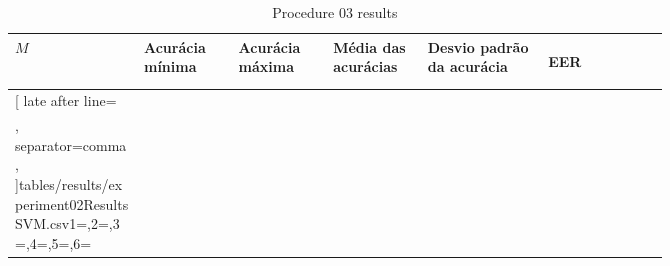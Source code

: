 \begin{table}[H]
	\newcommand{\mc}[3]{\multicolumn{#1}{#2}{#3}}
	\begin{center}
		\begin{tabular}{|p{0.15\linewidth}|p{0.11\linewidth}|p{0.11\linewidth}|p{0.11\linewidth}|p{0.14\linewidth}|p{0.14\linewidth}|}\hline
			\rowcolor{tcA}
			\centering\textbf{$M$} & \centering\textbf{Acurácia mínima} & \centering\textbf{Acurácia máxima} & \centering\textbf{Média das acurácias} & \centering\textbf{Desvio padrão da acurácia} & \begin{center}\textbf{EER}\end{center}\\\hline
			
			\rowcolor{tcB}
			\csvreader[
			late after line=\\\hline\rowcolor{tcB},%
			separator=comma,
			]{tables/results/experiment02ResultsSVM.csv}{1=\eme,2=\minAccu,3=\maxAccu,4=\meanAccu,5=\stdDev,6=\eer}{\centering\eme\% & \centering\minAccu & \centering\maxAccu & \centering\meanAccu & \centering\stdDev & \eer}
			
		\end{tabular}
	\end{center}
	\caption{Procedure 03 results}
	\label{tab:experiment03Results}
\end{table}